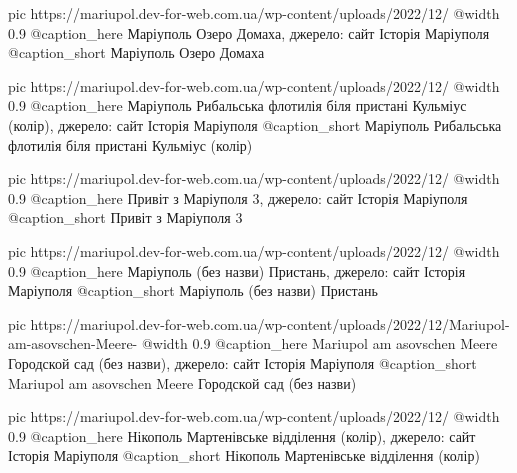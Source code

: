 	pic https://mariupol.dev-for-web.com.ua/wp-content/uploads/2022/12/%
	@width 0.9
	@caption_here Маріуполь Озеро Домаха, джерело: сайт Історія Маріуполя
	@caption_short Маріуполь Озеро Домаха

	pic https://mariupol.dev-for-web.com.ua/wp-content/uploads/2022/12/%
	@width 0.9
	@caption_here Маріуполь Рибальська флотилія біля пристані Кульміус (колір), джерело: сайт Історія Маріуполя
	@caption_short Маріуполь Рибальська флотилія біля пристані Кульміус (колір)

	pic https://mariupol.dev-for-web.com.ua/wp-content/uploads/2022/12/%
	@width 0.9
	@caption_here Привіт з Маріуполя 3, джерело: сайт Історія Маріуполя
	@caption_short Привіт з Маріуполя 3

	pic https://mariupol.dev-for-web.com.ua/wp-content/uploads/2022/12/%
	@width 0.9
	@caption_here Маріуполь (без назви) Пристань, джерело: сайт Історія Маріуполя
	@caption_short Маріуполь (без назви) Пристань

	pic https://mariupol.dev-for-web.com.ua/wp-content/uploads/2022/12/Mariupol-am-asovschen-Meere-%
	@width 0.9
	@caption_here Mariupol am asovschen Meere Городской сад (без назви), джерело: сайт Історія Маріуполя
	@caption_short Mariupol am asovschen Meere Городской сад (без назви)

	pic https://mariupol.dev-for-web.com.ua/wp-content/uploads/2022/12/%
	@width 0.9
	@caption_here Нікополь Мартенівське відділення (колір), джерело: сайт Історія Маріуполя
	@caption_short Нікополь Мартенівське відділення (колір)

